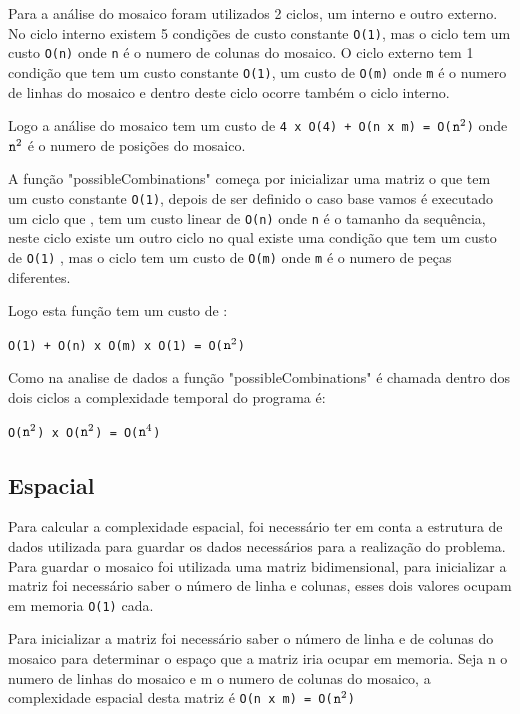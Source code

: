 \documentclass{article}
\begin{document}
Para a análise do mosaico foram utilizados 2 ciclos, um interno e outro externo. No ciclo interno existem 5 condições de custo constante \verb|O(1)|, mas o ciclo tem um custo \verb|O(n)| onde \verb|n| é o numero de colunas do mosaico. O ciclo externo tem 1 condição que tem um custo constante \verb|O(1)|, um custo de \verb|O(m)| onde \verb|m| é o numero de linhas do mosaico e dentro deste ciclo ocorre também o ciclo interno.

Logo a análise do mosaico tem um custo de \verb|4 x O(4) + O(n x m) = O(|$\verb|n|^2$\verb|)| onde $\verb|n|^2$ é o numero de posições do mosaico.

A função "possibleCombinations" começa por inicializar uma matriz o que tem um custo constante \verb|O(1)|, depois de ser definido o caso base vamos é executado um ciclo que , tem um custo linear de \verb|O(n)| onde \verb|n| é o tamanho da sequência, neste ciclo existe um outro ciclo no qual existe uma condição que tem um custo de \verb|O(1)| , mas o ciclo tem um custo de \verb|O(m)| onde \verb|m| é o numero de peças diferentes.

Logo esta função tem um custo de :
\begin{center}
    \verb|O(1) + O(n) x O(m) x O(1) = O(|$\verb|n|^2$\verb|)|
\end{center}
Como na analise de dados a função "possibleCombinations" é chamada dentro dos dois ciclos a complexidade temporal do programa é:
\begin{center}
   \verb|O(|$\verb|n|^2$\verb|) x |\verb|O(|$\verb|n|^2$\verb|) = O(|$\verb|n|^4$\verb|)|
\end{center}

\subsection{Espacial}
Para calcular a complexidade espacial, foi necessário ter em conta a estrutura de dados utilizada para guardar os dados necessários para a realização do problema. Para guardar o mosaico foi utilizada uma matriz bidimensional, para inicializar a matriz foi necessário saber o número de linha e colunas, esses dois valores ocupam em memoria \verb|O(1)| cada. 

Para inicializar a matriz foi necessário saber o número de linha e de colunas do mosaico para determinar o espaço que a matriz iria ocupar em memoria. Seja n o numero de linhas do mosaico e m o numero de colunas do mosaico, a complexidade espacial desta matriz é \verb|O(n x m) = O(|$\verb|n|^2$\verb|)| 
\end{document}
